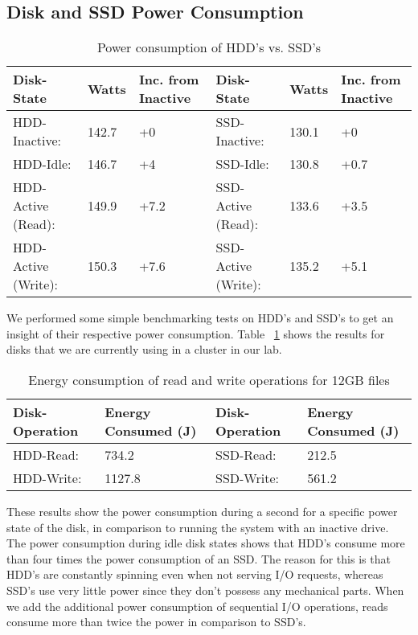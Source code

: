 \subsection{Disk and SSD Power Consumption}

\begin{table}[t]
  \centering
  \resizebox{\linewidth}{!}
  {
    \begin{tabular}{|l|l|l|l|l|l|}
      \hline
      \bf Disk-State & \bf Watts & \bf Inc. from Inactive & \bf Disk-State & \bf
      Watts & \bf Inc. from Inactive \\ \hline
      HDD-Inactive:       & 142.7 & +0   & SSD-Inactive:       & 130.1 & +0   \\
      \hline
      HDD-Idle:           & 146.7 & +4   & SSD-Idle:           & 130.8 & +0.7 \\
      \hline
      HDD-Active (Read):  & 149.9 & +7.2 & SSD-Active (Read):  & 133.6 & +3.5 \\
      \hline
      HDD-Active (Write): & 150.3 & +7.6 & SSD-Active (Write): & 135.2 & +5.1 \\
      \hline
    \end{tabular}
  }
  \caption{Power consumption of HDD's vs. SSD's}
  \label{tab:power-consumption}
\end{table}

We performed some simple benchmarking tests on HDD's and SSD's to get an insight
of their respective power consumption. Table ~\ref{tab:power-consumption} shows
the results for disks that we are currently using in a cluster in our lab.

\begin{table}[t]
  \centering
  \resizebox{\linewidth}{!}
  {
    \begin{tabular}{|l|l|l|l|}
      \hline
      \bf Disk-Operation & \bf Energy Consumed (J) & \bf Disk-Operation & \bf
      Energy Consumed (J) \\ \hline
      HDD-Read:  & 734.2  & SSD-Read:  & 212.5 \\ \hline
      HDD-Write: & 1127.8 & SSD-Write: & 561.2 \\ \hline
    \end{tabular}
  }
  \caption{Energy consumption of read and write operations for 12GB files}
  \label{tab:energy-consumption}
\end{table}

These results show the power consumption during a second for a specific power
state of the disk, in comparison to running the system with an inactive
drive. The power consumption during idle disk states shows that HDD's consume
more than four times the power consumption of an SSD. The reason for this is
that HDD's are constantly spinning even when not serving I/O requests, whereas
SSD's use very little power since they don't possess any mechanical parts. When
we add the additional power consumption of sequential I/O operations, reads
consume more than twice the power in comparison to SSD's.

